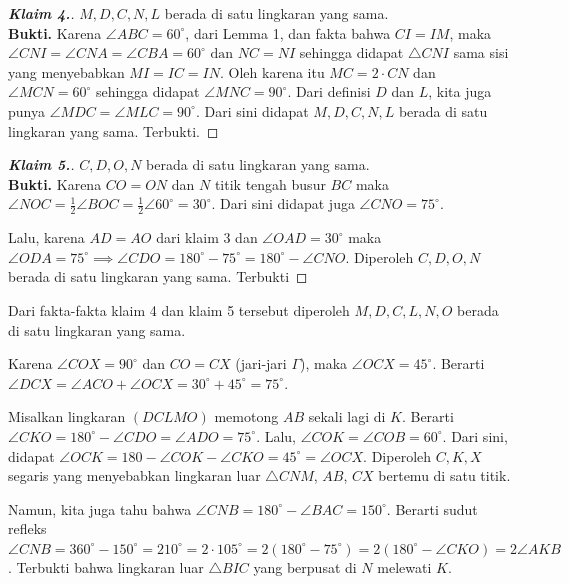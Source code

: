     \begin{proof}[\textbf{Klaim 4.}] $M,D,C,N,L$ berada di satu lingkaran yang sama.\\
        \textbf{Bukti.} Karena $\angle ABC = 60^\circ$, dari Lemma 1, dan fakta bahwa $CI=IM$, maka $\angle CNI = \angle CNA = \angle CBA = 60^\circ \text{ dan } NC = NI$ sehingga didapat  $\triangle CNI$ sama sisi yang menyebabkan $MI = IC = IN$. Oleh karena itu $MC = 2 \cdot CN$  dan $\angle MCN = 60^\circ$ sehingga didapat $\angle MNC = 90^\circ$. Dari definisi $D$ dan $L$, kita juga punya $\angle MDC = \angle MLC = 90^\circ$. Dari sini didapat $M,D,C,N,L$ berada di satu lingkaran yang sama. Terbukti.
    \end{proof}
    \hrulefill

    \begin{proof}[\textbf{Klaim 5.}] $C,D,O,N$ berada di satu lingkaran yang sama.\\
        \textbf{Bukti.} Karena $CO=ON$ dan $N$ titik tengah busur $BC$ maka $\angle NOC = \frac{1}{2}\angle BOC = \frac{1}{2}\angle 60^\circ = 30^\circ$. Dari sini didapat juga $\angle CNO = 75^\circ$. 
        
        Lalu, karena $AD=AO$ dari klaim 3 dan $\angle OAD = 30^\circ$ maka $\angle ODA = 75^\circ \implies \angle CDO = 180^\circ - 75^\circ = 180^\circ - \angle CNO$. Diperoleh $C,D,O,N$ berada di satu lingkaran yang sama. Terbukti
    \end{proof}
    \hrulefill

    Dari fakta-fakta klaim 4 dan klaim 5 tersebut diperoleh $M,D,C,L,N,O$ berada di satu lingkaran yang sama.


    Karena $\angle COX = 90^\circ$ dan $CO=CX$ (jari-jari $\Gamma$), maka $\angle OCX = 45^\circ$. Berarti $\angle DCX = \angle ACO + \angle OCX = 30^\circ + 45^\circ = 75^\circ$.

    Misalkan lingkaran $(DCLMO)$ memotong $AB$ sekali lagi di $K$. Berarti $\angle CKO = 180^\circ - \angle CDO = \angle ADO = 75^\circ$. Lalu, $\angle COK = \angle COB = 60^\circ$. Dari sini, didapat $\angle OCK = 180-\angle COK - \angle CKO = 45^\circ = \angle OCX$. Diperoleh $C,K,X$ segaris yang menyebabkan lingkaran luar $\triangle CNM$, $AB$, $CX$ bertemu di satu titik.

    Namun, kita juga tahu bahwa $\angle CNB = 180^\circ - \angle BAC = 150^\circ$. Berarti sudut refleks $\angle CNB = 360^\circ - 150^\circ = 210 ^\circ = 2\cdot 105^\circ = 2(180^\circ - 75^\circ) = 2(180^\circ - \angle CKO) = 2\angle AKB$. Terbukti bahwa lingkaran luar $\triangle BIC$ yang berpusat di $N$ melewati $K$.

